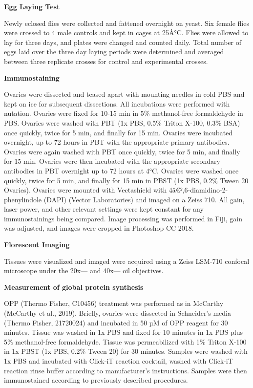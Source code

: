 \documentclass[12pt,oneside]{reedthesis}
\begin{document}
\textbf{Egg Laying Test}

Newly eclosed flies were collected and fattened overnight on yeast. Six
female flies were crossed to 4 male controls and kept in cages at 25Â°C.
Flies were allowed to lay for three days, and plates were changed and
counted daily. Total number of eggs laid over the three day laying
periods were determined and averaged between three replicate crosses for
control and experimental crosses.

\textbf{Immunostaining}

Ovaries were dissected and teased apart with mounting needles in cold
PBS and kept on ice for subsequent dissections. All incubations were
performed with nutation. Ovaries were fixed for 10-15 min in 5\%
methanol-free formaldehyde in PBS. Ovaries were washed with PBT (1x PBS,
0.5\% Triton X-100, 0.3\% BSA) once quickly, twice for 5 min, and finally
for 15 min. Ovaries were incubated overnight, up to 72 hours in PBT with
the appropriate primary antibodies. Ovaries were again washed with PBT
once quickly, twice for 5 min, and finally for 15 min. Ovaries were then
incubated with the appropriate secondary antibodies in PBT overnight up
to 72 hours at 4°C. Ovaries were washed once quickly, twice for 5 min,
and finally for 15 min in PBST (1x PBS, 0.2\% Tween 20 Ovaries). Ovaries
were mounted with Vectashield with 4â€²,6-diamidino-2-phenylindole (DAPI)
(Vector Laboratories) and imaged on a Zeiss 710. All gain, laser power,
and other relevant settings were kept constant for any immunostainings
being compared. Image processing was performed in Fiji, gain was
adjusted, and images were cropped in Photoshop CC 2018.

\textbf{Florescent Imaging}

Tissues were visualized and imaged were acquired using a Zeiss LSM-710
confocal microscope under the 20x--- and 40x--- oil objectives.

\textbf{Measurement of global protein synthesis}

OPP (Thermo Fisher, C10456) treatment was performed as in McCarthy
(McCarthy et al., 2019). Briefly, ovaries were
dissected in Schneider's media (Thermo Fisher, 21720024) and incubated
in 50 µM of OPP reagent for 30 minutes. Tissue was washed in 1x PBS and
fixed for 10 minutes in 1x PBS plus 5\% methanol-free formaldehyde.
Tissue was permeabilized with 1\% Triton X-100 in 1x PBST (1x PBS, 0.2\%
Tween 20) for 30 minutes. Samples were washed with 1x PBS and incubated
with Click-iT reaction cocktail, washed with Click-iT reaction rinse
buffer according to manufacturer's instructions. Samples were then
immunostained according to previously described procedures.
\end{document}

